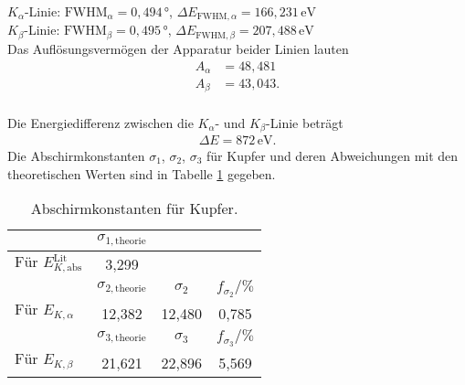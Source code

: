$K_\alpha$-Linie: $\text{FWHM}_\alpha= 0,494 \,\mathrm{°}$, \(\Delta E_{\text{FWHM},\alpha}=166,231\,\mathrm{eV}\)\\

$K_\beta$-Linie: $\text{FWHM}_\beta= 0,495 \,\mathrm{°}$, \(\Delta E_{\text{FWHM},\beta}=207,488\,\mathrm{eV}\)\\

Das Auflösungsvermögen der Apparatur beider Linien lauten
\begin{align*}
    A_\alpha &= 48,481\\
    A_\beta &= 43,043.\\
  \end{align*}

Die Energiedifferenz zwischen die $K_\alpha$- und $K_\beta$-Linie beträgt 
  \begin{align*}
      \Delta E  = 872\, \mathrm{eV}.
    \end{align*}
Die Abschirmkonstanten $\sigma_1$, $\sigma_2$, $\sigma_3$ für Kupfer und deren Abweichungen mit den theoretischen Werten sind in Tabelle \ref{tab:Kupferab} gegeben.

\begin{table}[H]
    \centering
    \caption{Abschirmkonstanten für Kupfer.}
    \label{tab:Kupferab}
    \begin{tabular}{|l  ||c|c|c| }
        \hline
        {}&$\sigma_{1,\text{theorie}}$&{}&{}\\
        \hline
        $\text{Für}\,\, E{^\text{Lit}_{K,\text{abs}}}$&3,299&{}&{} \\
        \hline
        \hline
        {}&$\sigma_{2,{\text{theorie}}}$&$\sigma_2$&$f_{\sigma_2}/\mathrm{\%}$\\
        \hline
        $\text{Für}\,\, E_{K,\alpha }$ &12,382&12,480&0,785\\
        \hline
        \hline
        {}&$\sigma_{3,{\text{theorie}}}$&$\sigma_3$&$f_{\sigma_3}/\mathrm{\%}$\\
        \hline
        $\text{Für}\,\, E_{K,\beta }$&21,621&22,896&5,569\\
        \hline
        \end{tabular}
\end{table}
